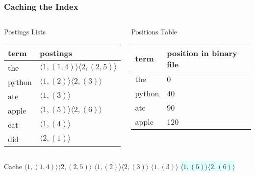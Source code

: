 \documentclass{beamer}
\begin{document}
\begin{frame}
  \frametitle{Caching the Index}

  \begin{columns}


    \begin{block}{Postings Lists}
      \begin{tabular}{ l | l }
        term & postings \\ \hline
        the & $ \langle 1,(1,4) \rangle \langle 2,(2,5) \rangle $ \\
        python & $ \langle 1,(2) \rangle \langle 2,(3) \rangle $ \\
        ate & $ \langle 1,(3) \rangle $ \\
        \rowcolor{LightCyan}
        apple & $ \langle 1,(5) \rangle \langle 2,(6) \rangle $ \\
        eat & $ \langle 1,(4) \rangle $ \\
        did & $ \langle 2,(1) \rangle $ \\
      \end{tabular}
    \end{block}


    \begin{block}{Positions Table}
      \begin{tabular}{ l | l }
        term & position in binary file \\ \hline
        the & 0 \\
        python & 40 \\
        ate & 90 \\
        \rowcolor{LightCyan}
        apple & 120 \\
      \end{tabular}
    \end{block}
    
  \end{columns}

  \begin{block}{Cache}
    $ \langle 1,(1,4) \rangle \langle 2,(2,5) \rangle $
    $ \langle 1,(2) \rangle \langle 2,(3) \rangle $
    $ \langle 1,(3) \rangle $
    \colorbox{LightCyan}{$ \langle 1,(5) \rangle \langle 2,(6) \rangle $}
  \end{block}
\end{frame}
\end{document}
